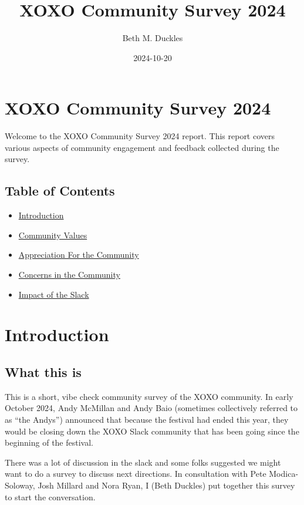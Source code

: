 \documentclass[
]{book}
\title{XOXO Community Survey 2024}
\author{Beth M. Duckles}
\date{2024-10-20}
\providecommand{\tightlist}{%
  \setlength{\itemsep}{0pt}\setlength{\parskip}{0pt}}
\begin{document}
\maketitle

{
\setcounter{tocdepth}{1}
\tableofcontents
}
\chapter{XOXO Community Survey 2024}\label{xoxo-community-survey-2024}

Welcome to the XOXO Community Survey 2024 report. This report covers various aspects of community engagement and feedback collected during the survey.

\section{Table of Contents}\label{table-of-contents}

\begin{itemize}
\tightlist
\item
  \href{01-intro.html}{Introduction}
\item
  \href{02-ValuesCommty.html}{Community Values}
\item
  \href{03-AppreciateCmmty.html}{Appreciation For the Community}
\item
  \href{04-Concerns.html}{Concerns in the Community}
\item
  \href{09-Impact.html}{Impact of the Slack}
\end{itemize}

\chapter{Introduction}\label{introduction}

\section{What this is}\label{what-this-is}

This is a short, vibe check community survey of the XOXO community. In early October 2024, Andy McMillan and Andy Baio (sometimes collectively referred to as ``the Andys'') announced that because the festival had ended this year, they would be closing down the XOXO Slack community that has been going since the beginning of the festival.

There was a lot of discussion in the slack and some folks suggested we might want to do a survey to discuss next directions. In consultation with Pete Modica-Soloway, Josh Millard and Nora Ryan, I (Beth Duckles) put together this survey to start the conversation.
\end{document}
